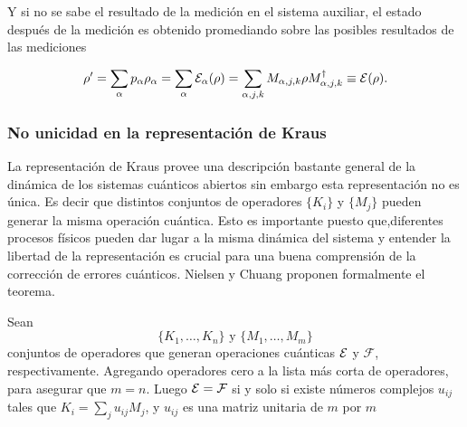 Y si no se sabe el resultado de la medición en el sistema auxiliar, el estado después de la medición es obtenido promediando sobre las posibles resultados de las mediciones {\cite{unm2014}}

\begin{equation}
    \rho'=\sum_\alpha p_\alpha \rho_\alpha=\sum_\alpha \mathcal{E}_\alpha(\rho)=\sum_{\alpha,j,k} M_{\alpha,j,k}\rho M_{\alpha,j,k}^\dagger\equiv\mathcal{E}(\rho).
\end{equation}


\subsubsection{No unicidad en la representación de Kraus}
 La representación de Kraus provee una descripción bastante general de la dinámica de los sistemas cuánticos abiertos sin embargo esta representación no es única. Es decir que distintos conjuntos de operadores $\{K_i\}$ y $\{M_j\}$ pueden generar la misma operación cuántica. Esto es importante puesto que,diferentes procesos físicos pueden dar lugar a la misma dinámica del sistema y entender la libertad de la representación es crucial para una buena comprensión de la corrección de errores cuánticos. Nielsen y Chuang {\cite{nielsen_chuang_2010}} proponen formalmente el teorema.


 \begin{theorem}\label{Libertad_unitaria}
    
    Sean \[\{K_1,\ldots,K_n\} \text{ y } \{M_1,\ldots , M_m\}\] conjuntos de operadores que generan operaciones cuánticas $\mathcal{E}$ y $\mathcal{F}$, respectivamente. Agregando operadores cero a la lista más corta de operadores, para asegurar que $m=n$. Luego $\mathcal{E}=\mathcal{F}$ si y solo si existe números complejos $u_{ij}$ tales que $K_i=\sum_j u_{ij}M_j$, y $u_{ij}$ es una matriz unitaria de $m$ por $m$
    
 \end{theorem}

